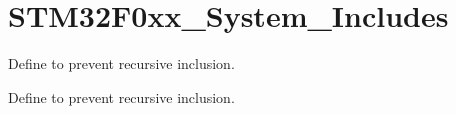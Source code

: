 \hypertarget{group___s_t_m32_f0xx___system___includes}{}\section{S\+T\+M32\+F0xx\+\_\+\+System\+\_\+\+Includes}
\label{group___s_t_m32_f0xx___system___includes}


Define to prevent recursive inclusion.  


Define to prevent recursive inclusion. 

